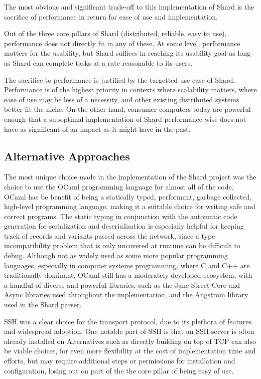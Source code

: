 \documentclass[twoside]{report}
\begin{document}
The most obvious and significant trade-off to this implementation of Shard is the sacrifice of performance in return for ease of use and implementation.

Out of the three core pillars of Shard (distributed, reliable, easy to use), performance does not directly fit in any of these.
At some level, performance matters for the usability, but Shard suffices in reaching its usability goal as long as Shard can complete tasks at a rate reasonable to its users.

The sacrifice to performance is justified by the targetted use-case of Shard.
Performance is of the highest priority in contexts where scalability matters, where ease of use may be less of a necessity, and other existing distributed systems better fit the niche.
On the other hand, consumer computers today are powerful enough that a suboptimal implementation of Shard performance wise does not have as significant of an impact as it might have in the past.

\subsection{Alternative Approaches}

The most unique choice made in the implementation of the Shard project was the choice to use the OCaml programming language for almost all of the code.
OCaml has be benefit of being a statically typed, performant, garbage collected, high-level programming language, making it a suitable choice for writing safe and correct programs.
The static typing in conjunction with the automatic code generation for serialization and deserialization is especially helpful for keeping track of records and variants passed across the network, since a type incompatibility problem that is only uncovered at runtime can be difficult to debug.
Although not as widely used as some more popular programming languages, especially in computer systems programming, where C and C++ are traditionally dominant, OCaml still has a moderately developed ecosystem, with a handful of diverse and powerful libraries, such as the Jane Street Core and Async libraries used throughout the implementation, and the Angstrom library used in the Shard parser.

SSH was a clear choice for the transport protocol, due to its plethora of features and widespread adoption.
One notable part of SSH is that an SSH server is often already installed on
Alternatives such as directly building on top of TCP can also be viable choices, for even more flexibility at the cost of implementation time and efforts, but may require additional steps or permissions for installation and configuration, losing out on part of the the core pillar of being easy of use.
\end{document}
